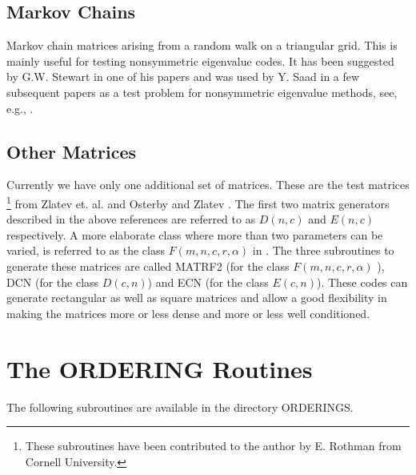 \vskip 2.5in
\subsection{Markov Chains}

Markov chain matrices arising from a random walk on a
triangular grid. This is mainly useful for testing nonsymmetric 
eigenvalue codes. It has been suggested by G.W. Stewart in one of his
papers \cite{Stewart-SRRIT} and was used by Y. Saad in a few
subsequent papers as a test problem for nonsymmetric eigenvalue methods,
see,  e.g., \cite{Saad-cheb}. 

\subsection{Other Matrices}

Currently we have only one additional set of matrices. These are
the test matrices
\footnote{These subroutines have been contributed 
to the author by E. Rothman from Cornell University.} from 
Zlatev et. al. \cite{Zlatev-tests} and Osterby and Zlatev
\cite{OsterbyZlatev-book}. The first two matrix generators
described in the above references 
are referred to as $D(n,c) $ and $E(n,c)$ respectively.
A more elaborate class where more than two parameters can be varied,
is referred to as the class $F(m,n,c,r,\alpha) $ in
\cite{OsterbyZlatev-book,Zlatev-tests}. The three subroutines to generate
these matrices are called MATRF2 (for the class $F(m,n,c,r,\alpha)$ ),
DCN (for the class $D(c,n)$) and ECN (for the class $E(c,n) $).
These codes can generate rectangular as well as square 
matrices and allow a good flexibility in making the matrices 
more or less dense and more or less well conditioned.

\section{The ORDERING Routines}
The following subroutines are available in the directory ORDERINGS.

\vskip 0.3in





